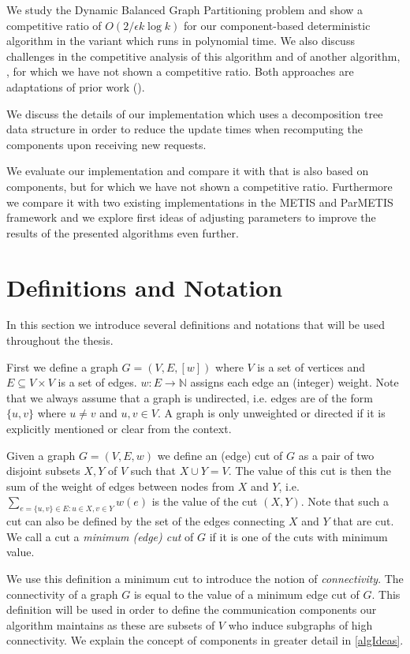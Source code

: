\documentclass[a4paper,xcolor=dvipsnames, tikz, 12pt]{article}
\newcommand{\crep}{\text{C{\scriptsize REP}}}
\newcommand{\coreDel}{\text{C{\scriptsize REP}-C{\scriptsize ORE}}}
\newcommand{\adjDel}{\text{C{\scriptsize REP}-A{\scriptsize DJ}}}
\theoremstyle{definition}
\begin{document}
	We study the Dynamic Balanced Graph Partitioning problem and show a competitive ratio of $O(2/\epsilon k\log k)$ for our component-based deterministic algorithm \crep{} in the variant \adjDel{} which runs in polynomial time. We also discuss challenges in the competitive analysis of this algorithm and of another algorithm, \coreDel, for which we have not shown a competitive ratio. Both approaches are adaptations of prior work (\cite{Avin2015, Avin2016}).
	
	We discuss the details of our implementation which uses a decomposition tree data structure in order to reduce the update times when recomputing the components upon receiving new requests.
	
	We evaluate our implementation and compare it with \coreDel{} that is also based on components, but for which we have not shown a competitive ratio. Furthermore we compare it with two existing implementations in the METIS and ParMETIS framework and we explore first ideas of adjusting parameters to improve the results of the presented algorithms even further.
	
	\section{Definitions and Notation}
	
	In this section we introduce several definitions and notations that will be used throughout the thesis.
	
	First we define a graph $G=(V, E, [w])$ where $V$ is a set of vertices and $E\subseteq V \times V$ is a set of edges. $w:E \rightarrow \mathbb{N}$ assigns each edge an (integer) weight. Note that we always assume that a graph is undirected, i.e. edges are of the form $\{u,v\}$ where $u\neq v$ and $u,v\in V$. A graph is only unweighted or directed if it is explicitly mentioned or clear from the context.
	
	Given a graph $G=(V,E,w)$ we define an (edge) cut of $G$ as a pair of two disjoint subsets $X,Y$ of $V$ such that $X\cup Y=V$. The value of this cut is then the sum of the weight of edges between nodes from $X$ and $Y$, i.e. $\sum_{e=\{u,v\}\in E:u\in X, v\in Y}w(e)$ is the value of the cut $(X,Y)$. Note that such a cut can also be defined by the set of the edges connecting $X$ and $Y$ that are cut. We call a cut a \textit{minimum (edge) cut} of $G$ if it is one of the cuts with minimum value.
	
	We use this definition a minimum cut to introduce the notion of \textit{connectivity}. The connectivity of a graph $G$ is equal to the value of a minimum edge cut of $G$. This definition will be used in order to define the communication components our algorithm maintains as these are subsets of $V$ who induce subgraphs of high connectivity. We explain the concept of components in greater detail in \cref{algIdeas}.
	
\end{document}
